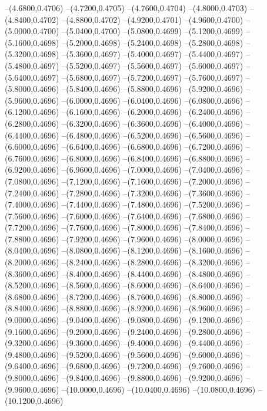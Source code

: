 {	--(4.6800,0.4706)
	--(4.7200,0.4705)
	--(4.7600,0.4704)
	--(4.8000,0.4703)
	--(4.8400,0.4702)
	--(4.8800,0.4702)
	--(4.9200,0.4701)
	--(4.9600,0.4700)
	--(5.0000,0.4700)
	--(5.0400,0.4700)
	--(5.0800,0.4699)
	--(5.1200,0.4699)
	--(5.1600,0.4698)
	--(5.2000,0.4698)
	--(5.2400,0.4698)
	--(5.2800,0.4698)
	--(5.3200,0.4698)
	--(5.3600,0.4697)
	--(5.4000,0.4697)
	--(5.4400,0.4697)
	--(5.4800,0.4697)
	--(5.5200,0.4697)
	--(5.5600,0.4697)
	--(5.6000,0.4697)
	--(5.6400,0.4697)
	--(5.6800,0.4697)
	--(5.7200,0.4697)
	--(5.7600,0.4697)
	--(5.8000,0.4696)
	--(5.8400,0.4696)
	--(5.8800,0.4696)
	--(5.9200,0.4696)
	--(5.9600,0.4696)
	--(6.0000,0.4696)
	--(6.0400,0.4696)
	--(6.0800,0.4696)
	--(6.1200,0.4696)
	--(6.1600,0.4696)
	--(6.2000,0.4696)
	--(6.2400,0.4696)
	--(6.2800,0.4696)
	--(6.3200,0.4696)
	--(6.3600,0.4696)
	--(6.4000,0.4696)
	--(6.4400,0.4696)
	--(6.4800,0.4696)
	--(6.5200,0.4696)
	--(6.5600,0.4696)
	--(6.6000,0.4696)
	--(6.6400,0.4696)
	--(6.6800,0.4696)
	--(6.7200,0.4696)
	--(6.7600,0.4696)
	--(6.8000,0.4696)
	--(6.8400,0.4696)
	--(6.8800,0.4696)
	--(6.9200,0.4696)
	--(6.9600,0.4696)
	--(7.0000,0.4696)
	--(7.0400,0.4696)
	--(7.0800,0.4696)
	--(7.1200,0.4696)
	--(7.1600,0.4696)
	--(7.2000,0.4696)
	--(7.2400,0.4696)
	--(7.2800,0.4696)
	--(7.3200,0.4696)
	--(7.3600,0.4696)
	--(7.4000,0.4696)
	--(7.4400,0.4696)
	--(7.4800,0.4696)
	--(7.5200,0.4696)
	--(7.5600,0.4696)
	--(7.6000,0.4696)
	--(7.6400,0.4696)
	--(7.6800,0.4696)
	--(7.7200,0.4696)
	--(7.7600,0.4696)
	--(7.8000,0.4696)
	--(7.8400,0.4696)
	--(7.8800,0.4696)
	--(7.9200,0.4696)
	--(7.9600,0.4696)
	--(8.0000,0.4696)
	--(8.0400,0.4696)
	--(8.0800,0.4696)
	--(8.1200,0.4696)
	--(8.1600,0.4696)
	--(8.2000,0.4696)
	--(8.2400,0.4696)
	--(8.2800,0.4696)
	--(8.3200,0.4696)
	--(8.3600,0.4696)
	--(8.4000,0.4696)
	--(8.4400,0.4696)
	--(8.4800,0.4696)
	--(8.5200,0.4696)
	--(8.5600,0.4696)
	--(8.6000,0.4696)
	--(8.6400,0.4696)
	--(8.6800,0.4696)
	--(8.7200,0.4696)
	--(8.7600,0.4696)
	--(8.8000,0.4696)
	--(8.8400,0.4696)
	--(8.8800,0.4696)
	--(8.9200,0.4696)
	--(8.9600,0.4696)
	--(9.0000,0.4696)
	--(9.0400,0.4696)
	--(9.0800,0.4696)
	--(9.1200,0.4696)
	--(9.1600,0.4696)
	--(9.2000,0.4696)
	--(9.2400,0.4696)
	--(9.2800,0.4696)
	--(9.3200,0.4696)
	--(9.3600,0.4696)
	--(9.4000,0.4696)
	--(9.4400,0.4696)
	--(9.4800,0.4696)
	--(9.5200,0.4696)
	--(9.5600,0.4696)
	--(9.6000,0.4696)
	--(9.6400,0.4696)
	--(9.6800,0.4696)
	--(9.7200,0.4696)
	--(9.7600,0.4696)
	--(9.8000,0.4696)
	--(9.8400,0.4696)
	--(9.8800,0.4696)
	--(9.9200,0.4696)
	--(9.9600,0.4696)
	--(10.0000,0.4696)
	--(10.0400,0.4696)
	--(10.0800,0.4696)
	--(10.1200,0.4696)
}
